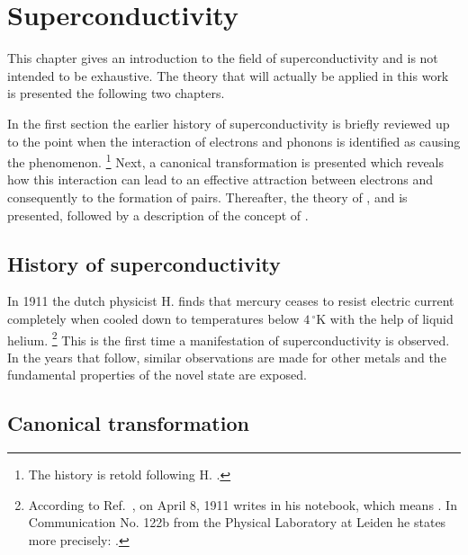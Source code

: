 
\chapter{Superconductivity}

This chapter gives an introduction to the field of superconductivity and is not
intended to be exhaustive. The theory that will actually be applied in this work
is presented the following two chapters.

In the first section the earlier history of superconductivity is briefly
reviewed up to the point when the interaction of electrons and phonons is
identified as causing the phenomenon.%
%
\footnote{The history is retold following H. 
\cite{Froehlich82}.}
%
Next, a canonical transformation is presented which reveals how this interaction
can lead to an effective attraction between electrons and consequently to the
formation of  pairs. Thereafter, the theory of ,
 and  is presented, followed by a description of
the concept of .

\section{History of superconductivity}

In 1911 the dutch physicist H.  finds that mercury ceases
to resist electric current completely when cooled down to temperatures below
$4\,^\circ \mathrm K$ with the help of liquid helium.%
%
\footnote{According to Ref.~, on April 8, 1911
 writes  in his notebook, which
means . In Communication No. 122b
from the Physical Laboratory at Leiden he states more precisely: 
\cite{KamerlinghOnnes11}.}
%
This is the first time a manifestation of superconductivity is observed. In the
years that follow, similar observations are made for other metals and the
fundamental properties of the novel state are exposed.

\section{Canonical transformation}

